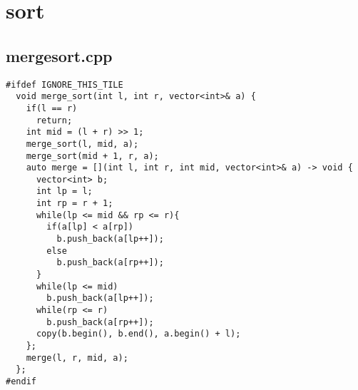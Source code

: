 \documentclass[UTF8, a4paper, titlepage, twoside]{ctexart}
\begin{document}
\clearpage
\section{sort}
\subsection{mergesort.cpp}
\begin{verbatim}
#ifdef IGNORE_THIS_TILE
  void merge_sort(int l, int r, vector<int>& a) {
    if(l == r)
      return;
    int mid = (l + r) >> 1;
    merge_sort(l, mid, a);
    merge_sort(mid + 1, r, a);
    auto merge = [](int l, int r, int mid, vector<int>& a) -> void {
      vector<int> b;
      int lp = l;
      int rp = r + 1;
      while(lp <= mid && rp <= r){
        if(a[lp] < a[rp])
          b.push_back(a[lp++]);
        else  
          b.push_back(a[rp++]);
      }
      while(lp <= mid)
        b.push_back(a[lp++]);
      while(rp <= r)
        b.push_back(a[rp++]);
      copy(b.begin(), b.end(), a.begin() + l);
    };
    merge(l, r, mid, a);
  };
#endif
\end{verbatim}

\clearpage
\end{document}
